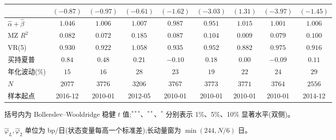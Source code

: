 \begin{table}[htbp]
\begin{threeparttable}
\begin{tabular}{lcccccccc}
 & $(-0.87)$ & $(-0.97)$ & $(-0.61)$ & $(-1.62)$ & $(-3.03)$ & $(1.31)$ & $(-3.97)$ & $(-1.45)$ \\[2pt]
\midrule
$\hat\alpha+\hat\beta$ & $1.046$ & $1.006$ & $1.007$ & $0.987$ & $0.951$ & $1.015$ & $1.001$ & $1.006$ \\
MZ $R^2$ & $0.082$ & $0.072$ & $0.185$ & $0.087$ & $0.104$ & $0.009$ & $0.079$ & $0.100$ \\
VR(5) & $0.930$ & $0.922$ & $1.058$ & $0.935$ & $0.952$ & $0.882$ & $0.975$ & $0.916$ \\
买持夏普 & $0.84$ & $0.48$ & $0.21$ & $-0.10$ & $0.18$ & $0.00$ & $-0.09$ & $0.11$ \\
年化波动(\%) & $15$ & $16$ & $28$ & $23$ & $19$ & $22$ & $24$ & $29$ \\
$N$ & $2077$ & $3776$ & $3206$ & $3767$ & $3773$ & $3771$ & $3764$ & $2556$ \\
样本起点 & \scriptsize 2016-12 & \scriptsize 2010-01 & \scriptsize 2012-05 & \scriptsize 2010-01 & \scriptsize 2010-01 & \scriptsize 2010-01 & \scriptsize 2010-01 & \scriptsize 2014-12 \\
\bottomrule
\end{tabular}
\begin{tablenotes}\scriptsize
\item 括号内为 Bollerslev--Wooldridge 稳健 $t$ 值;$^{***}$、$^{**}$、$^{*}$ 分别表示 1\%、5\%、10\% 显著水平(双侧)。
\item $\hat\varphi_L,\hat\varphi_2$ 单位为 bp/日(状态变量每高一个标准差);长动量窗为 $\min(244,N/6)$ 日。
\end{tablenotes}\end{threeparttable}\end{table}


